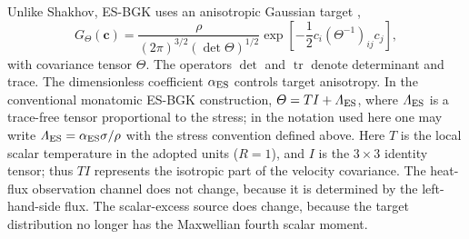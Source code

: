 \documentclass[lineno,paper]{JFM-FLM_Au}
\newenvironment{revision}{\nolinenumbers\begin{tcolorbox}[breakable,colback=revisionyellow,colframe=revisionyellow,boxrule=0pt,arc=0pt,left=5pt,right=5pt,top=5pt,bottom=5pt,before skip=6pt,after skip=6pt]\captionsetup{width=\linewidth}}{\end{tcolorbox}\linenumbers}
\newenvironment{revision}{}{}
\newcommand{\tr}{\operatorname{tr}}
\begin{document}
\begin{revision}
Unlike Shakhov, ES-BGK uses an anisotropic Gaussian target \citep{Holway1966ESBGK,FeiLiuLiuZhang2020ShockBenchmark},
\begin{equation}
  G_\Theta(\boldsymbol c)
  =\frac{\rho}{(2\pi)^{3/2}(\det\Theta)^{1/2}}
  \exp\left[-\frac12 c_i(\Theta^{-1})_{ij}c_j\right],
  \label{eq:es_gaussian}
\end{equation}
with covariance tensor $\Theta$.
 The operators $\det$ and $\tr$ denote determinant and trace.
The dimensionless coefficient $\alpha_{\rm ES}$ controls target anisotropy.  In the conventional monatomic ES-BGK construction, $\Theta=T I+\Lambda_{\rm ES}$, where $\Lambda_{\rm ES}$ is a trace-free tensor proportional to the stress; in the notation used here one may write $\Lambda_{\rm ES}=\alpha_{\rm ES}\sigma/\rho$ with the stress convention defined above. Here $T$ is the local scalar temperature in the adopted
units ($R=1$), and $I$ is the $3\times3$ identity tensor;
thus $TI$ represents the isotropic part of the
velocity covariance. The heat-flux observation channel does not change, because it is determined by the left-hand-side flux.  The scalar-excess source does change, because the target distribution no longer has the Maxwellian fourth scalar moment.
\end{revision}
\end{document}
